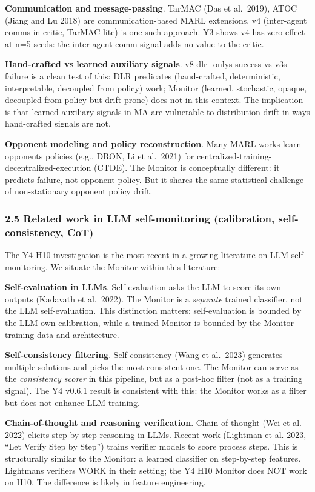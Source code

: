 \documentclass[
]{article}
\begin{document}
\textbf{Communication and message-passing}. TarMAC (Das et al.~2019),
ATOC (Jiang and Lu 2018) are communication-based MARL extensions. v4
(inter-agent comms in critic, TarMAC-lite) is one such approach. Y3
shows v4 has zero effect at n=5 seeds: the inter-agent comm signal adds
no value to the critic.

\textbf{Hand-crafted vs learned auxiliary signals}. v8 dlr\_onlys
success vs v3s failure is a clean test of this: DLR predicates
(hand-crafted, deterministic, interpretable, decoupled from policy)
work; Monitor (learned, stochastic, opaque, decoupled from policy but
drift-prone) does not in this context. The implication is that learned
auxiliary signals in MA are vulnerable to distribution drift in ways
hand-crafted signals are not.

\textbf{Opponent modeling and policy reconstruction}. Many MARL works
learn opponents policies (e.g., DRON, Li et al.~2021) for
centralized-training- decentralized-execution (CTDE). The Monitor is
conceptually different: it predicts failure, not opponent policy. But it
shares the same statistical challenge of non-stationary opponent policy
drift.

\subsubsection{2.5 Related work in LLM self-monitoring (calibration,
self-consistency,
CoT)}\label{related-work-in-llm-self-monitoring-calibration-self-consistency-cot}

The Y4 H10 investigation is the most recent in a growing literature on
LLM self-monitoring. We situate the Monitor within this literature:

\textbf{Self-evaluation in LLMs}. Self-evaluation asks the LLM to score
its own outputs (Kadavath et al.~2022). The Monitor is a \emph{separate}
trained classifier, not the LLM self-evaluation. This distinction
matters: self-evaluation is bounded by the LLM own calibration, while a
trained Monitor is bounded by the Monitor training data and
architecture.

\textbf{Self-consistency filtering}. Self-consistency (Wang et al.~2023)
generates multiple solutions and picks the most-consistent one. The
Monitor can serve as the \emph{consistency scorer} in this pipeline, but
as a post-hoc filter (not as a training signal). The Y4 v0.6.1 result is
consistent with this: the Monitor works as a filter but does not enhance
LLM training.

\textbf{Chain-of-thought and reasoning verification}. Chain-of-thought
(Wei et al. 2022) elicits step-by-step reasoning in LLMs. Recent work
(Lightman et al. 2023, ``Let Verify Step by Step'') trains verifier
models to score process steps. This is structurally similar to the
Monitor: a learned classifier on step-by-step features. Lightmans
verifiers WORK in their setting; the Y4 H10 Monitor does NOT work on
H10. The difference is likely in feature engineering.
\end{document}
